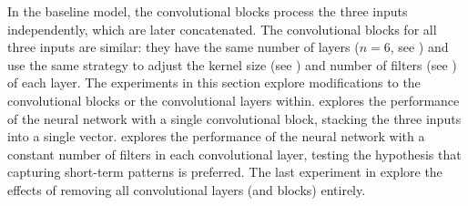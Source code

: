 
In the baseline model, the convolutional blocks process the
three inputs independently, which are later concatenated.
The convolutional blocks for all three inputs are similar:
they have the same number of layers ($n=6$, see
) and use the
same strategy to adjust the kernel size (see
) and number of filters (see
) of each layer. The
experiments in this section explore modifications to the
convolutional blocks or the convolutional layers within.
 explores the
performance of the neural network with a single
convolutional block, stacking the three inputs into a single
vector.  explores the
performance of the neural network with a constant number of
filters in each convolutional layer, testing the hypothesis
that capturing short-term patterns is preferred. The last
experiment in  explore
the effects of removing all convolutional layers (and
blocks) entirely.
